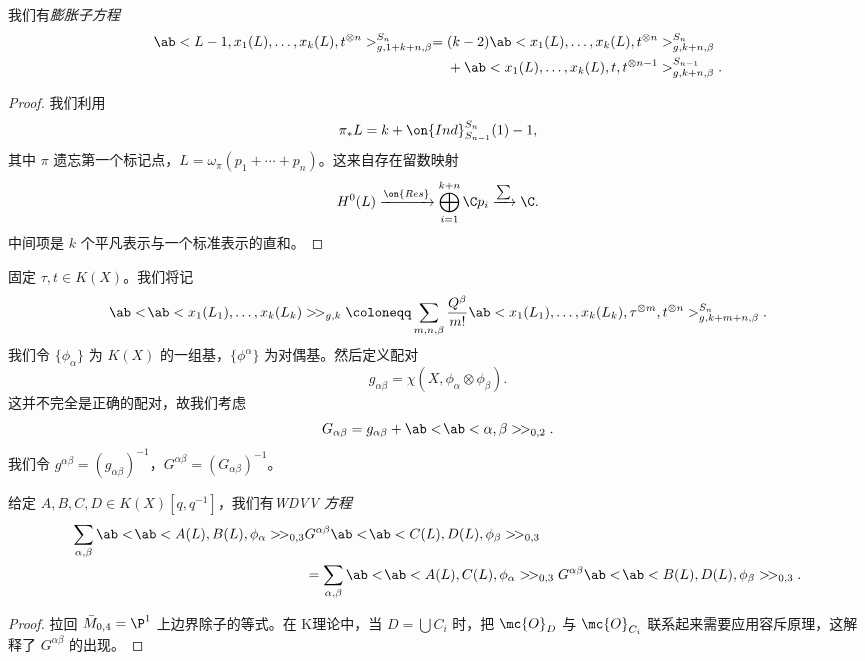 \begin{lem}
    我们有\textit{膨胀子方程}
    \begin{align*}
        \ab<L-1, x_1(L), \ldots, x_k(L), t^{\otimes n}>_{g,1+k+n,\beta}^{S_n} ={}& (k-2)\ab<x_1(L), \ldots, x_k(L), t^{\otimes n}>_{g,k+n,\beta}^{S_n} \\
        &+ \ab<x_1(L), \ldots, x_k(L), t, t^{\otimes n-1}>_{g,k+n,\beta}^{S_{n-1}}.
    \end{align*}
\end{lem}

\begin{proof}
    我们利用
    \[ \pi_* L = k + \on{Ind}_{S_{n-1}}^{S_n}(1) - 1, \]
    其中 \(\pi\) 遗忘第一个标记点，\(L = \omega_{\pi} (p_1 + \cdots + p_n)\)。这来自存在留数映射
    \[ H^0(L) \xrightarrow{\on{Res}} \bigoplus_{i=1}^{k+n} \C p_i \xrightarrow{\sum} \C. \]
    中间项是 \(k\) 个平凡表示与一个标准表示的直和。
\end{proof}

\begin{notn}
    固定 \(\tau, t \in K(X)\)。我们将记
    \[ \ab<\!\ab<x_1(L_1), \ldots, x_k(L_k)>\!>_{g,k} \coloneqq \sum_{m,n,\beta} \frac{Q^{\beta}}{m!} \ab<x_1(L_1), \ldots, x_k(L_k), \tau^{\otimes m}, t^{\otimes n}>_{g,k+m+n,\beta}^{S_n}. \]
    我们令 \(\{\phi_{\alpha}\}\) 为 \(K(X)\) 的一组基，\(\{\phi^{\alpha}\}\) 为对偶基。然后定义配对
    \[ g_{\alpha\beta} = \chi(X, \phi_{\alpha} \otimes \phi_{\beta}). \]
    这并不完全是正确的配对，故我们考虑
    \[ G_{\alpha\beta} = g_{\alpha\beta} + \ab<\!\ab<\alpha,\beta>\!>_{0,2}. \]
    我们令 \(g^{\alpha\beta} = (g_{\alpha\beta})^{-1}\)，\(G^{\alpha\beta} = (G_{\alpha\beta})^{-1}\)。
\end{notn}

\begin{lem}
    给定 \(A,B,C,D \in K(X)[q,q^{-1}]\)，我们有\textit{WDVV 方程}
    \begin{align*}
        \sum_{\alpha,\beta} \ab<\!\ab< A(L), B(L), \phi_{\alpha}>\! >_{0,3}& G^{\alpha\beta}\ab<\!\ab< C(L), D(L), \phi_{\beta}>\! >_{0,3} \\
        &= \sum_{\alpha,\beta} \ab<\!\ab< A(L), C(L), \phi_{\alpha}>\! >_{0,3} G^{\alpha\beta}\ab<\!\ab< B(L), D(L), \phi_{\beta}>\! >_{0,3}. 
    \end{align*}
\end{lem}

\begin{proof}
    拉回 \(\bar{M}_{0,4} = \P^1\) 上边界除子的等式。在 K理论中，当 \(D = \bigcup C_i\) 时，把 \(\mc{O}_D\) 与 \(\mc{O}_{C_i}\) 联系起来需要应用容斥原理，这解释了 \(G^{\alpha\beta}\) 的出现。
\end{proof}

